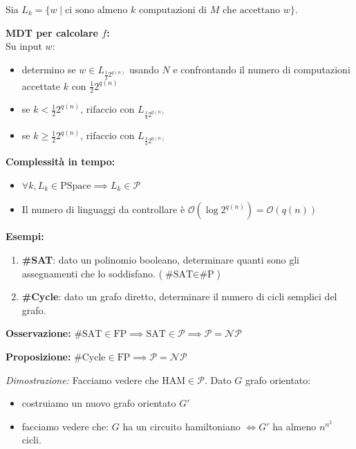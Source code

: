 Sia $L_k = \{ w \mid \text{ci sono almeno } k \text{ computazioni di } M \text{ che accettano } w \}$.

\newpage{}
\textbf{MDT per calcolare $f$:} \\
Su input $w$:
\begin{itemize}
    \item determino se $w \in L_{\frac{1}{2} 2^{q(n)}}$ usando $N$ e confrontando il numero di computazioni accettate $k$ con $\frac{1}{2} 2^{q(n)}$
    \item se $k < \frac{1}{2} 2^{q(n)}$, rifaccio con $L_{\frac{1}{4} 2^{q(n)}}$
    \item se $k \ge \frac{1}{2} 2^{q(n)}$, rifaccio con $L_{\frac{3}{4} 2^{q(n)}}$
\end{itemize}

\textbf{Complessità in tempo:}
\begin{itemize}
    \item $\forall k, L_k \in \text{PSpace} \implies L_k \in \mathcal{P}$
    \item Il numero di linguaggi da controllare è $\mathcal{O}(\log 2^{q(n)}) = \mathcal{O}(q(n))$
\end{itemize}

\vspace{0.4cm}
\textbf{Esempi:}
\begin{enumerate}
    \item \textbf{\#SAT}: dato un polinomio booleano, determinare quanti sono gli assegnamenti che lo soddisfano. ($\text{\#SAT} \in \text{\#P}$)
    \item \textbf{\#Cycle}: dato un grafo diretto, determinare il numero di cicli semplici del grafo.
\end{enumerate}

\textbf{Osservazione:} $\text{\#SAT} \in \text{FP} \implies \text{SAT} \in \mathcal{P} \implies \mathcal{P} = \mathcal{NP}$

\vspace{0.4cm}
\textbf{Proposizione:} $\text{\#Cycle} \in \text{FP} \implies \mathcal{P} = \mathcal{NP}$

\textit{Dimostrazione:} Facciamo vedere che $\text{HAM} \in \mathcal{P}$. Dato $G$ grafo orientato:
\begin{itemize}
    \item costruiamo un nuovo grafo orientato $G'$
    \item facciamo vedere che: $G$ ha un circuito hamiltoniano $\iff G'$ ha almeno $n^{n^2}$ cicli.
\end{itemize}

